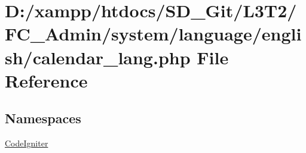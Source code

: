 \hypertarget{_admin_2system_2language_2english_2calendar__lang_8php}{}\section{D\+:/xampp/htdocs/\+S\+D\+\_\+\+Git/\+L3\+T2/\+F\+C\+\_\+\+Admin/system/language/english/calendar\+\_\+lang.php File Reference}
\label{_admin_2system_2language_2english_2calendar__lang_8php}
\subsection*{Namespaces}
\begin{DoxyCompactItemize}
\item 
 \hyperlink{namespace_code_igniter}{Code\+Igniter}
\end{DoxyCompactItemize}
